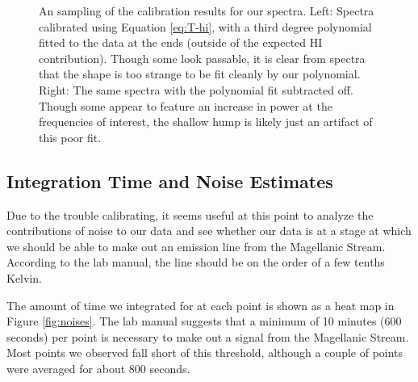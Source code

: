 \documentclass[12pt]{article}
\begin{document}
\begin{figure}[H]
\caption[SODUMB]{An sampling of the calibration results for our spectra. Left: Spectra calibrated using Equation \ref{eq:T-hi}, with a third degree polynomial fitted to the data at the ends (outside of the expected HI contribution). Though some look passable, it is clear from spectra that the shape is too strange to be fit cleanly by our polynomial. Right: The same spectra with the polynomial fit subtracted off. Though some appear to feature an increase in power at the frequencies of interest, the shallow hump is likely just an artifact of this poor fit.
}
\label{fig:calibration}
\end{figure}

\subsection*{Integration Time and Noise Estimates}
Due to the trouble calibrating, it seems useful at this point to analyze the contributions of noise to our data and see whether our data is at a stage at which we should be able to make out an emission line from the Magellanic Stream. According to the lab manual, the line should be on the order of a few tenths Kelvin.

The amount of time we integrated for at each point is shown as a heat map in Figure \ref{fig:noises}. The lab manual suggests that a minimum of 10 minutes (600 seconds) per point is necessary to make out a signal from the Magellanic Stream. Most points we observed fall short of this threshold, although a couple of points were averaged for about 800 seconds.
\end{document}
